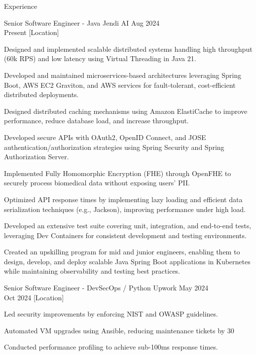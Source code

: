 \documentclass{resume} %
\begin{document}

\begin{rSection}{Experience}
    \begin{rSubsection}
        {Senior Software Engineer - Java}
        {Jendi AI}
        {Aug 2024 \\ Present}
        [Location]
        \begin{rItemize}
            \item Designed and implemented scalable distributed systems handling high throughput (60k RPS) and low latency using Virtual Threading in Java 21.
            \item Developed and maintained microservices-based architectures leveraging Spring Boot, AWS EC2 Graviton, and AWS services for fault-tolerant, cost-efficient distributed deployments.
            \item Designed distributed caching mechanisms using Amazon ElastiCache to improve performance, reduce database load, and increase throughput.
            \item Developed secure APIs with OAuth2, OpenID Connect, and JOSE authentication/authorization strategies using Spring Security and Spring Authorization Server.
            \item Implemented Fully Homomorphic Encryption (FHE) through OpenFHE to securely process biomedical data without exposing users' PII.
            \item Optimized API response times by implementing lazy loading and efficient data serialization techniques (e.g., Jackson), improving performance under high load.
            \item Developed an extensive test suite covering unit, integration, and end-to-end tests, leveraging Dev Containers for consistent development and testing environments.
            \item Created an upskilling program for mid and junior engineers, enabling them to design, develop, and deploy scalable Java Spring Boot applications in Kubernetes while maintaining observability and testing best practices.
        \end{rItemize}
    \end{rSubsection}

    \begin{rSubsection}
        {Senior Software Engineer - DevSecOps / Python}
        {Upwork}
        {May 2024 \\ Oct 2024}
        [Location]
        \begin{rItemize}
            \item Led security improvements by enforcing NIST and OWASP guidelines.
            \item Automated VM upgrades using Ansible, reducing maintenance tickets by 30%
            \item Conducted performance profiling to achieve sub-100ms response times.
        \end{rItemize}
    \end{rSubsection}


\end{rSection}
\end{document}
